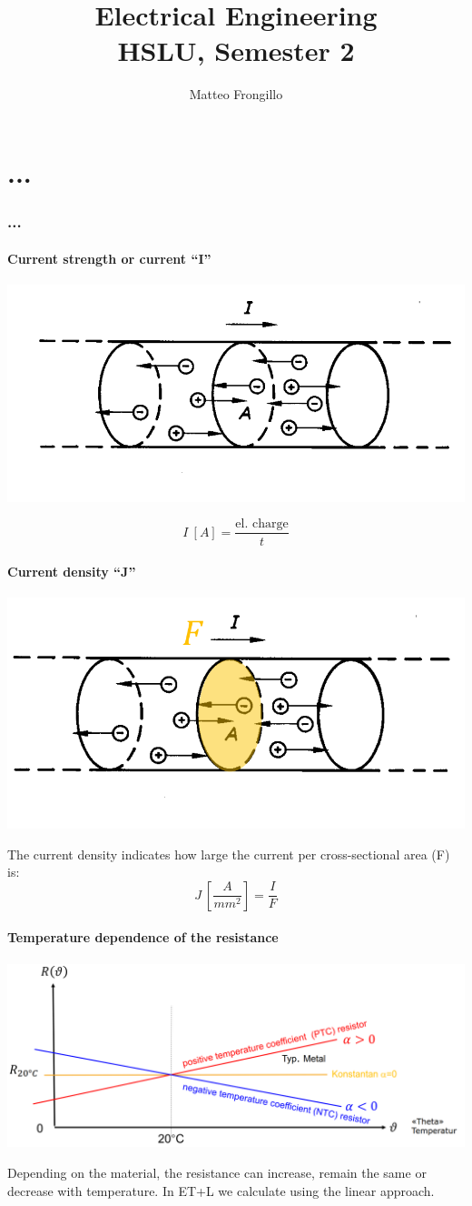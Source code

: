 \documentclass{article}
\title{\textbf{Electrical Engineering \\ HSLU, Semester 2}}
\author{Matteo Frongillo}
\date{}
\begin{document}
\maketitle
\tableofcontents
\pagebreak

\part{...}
\section{...}
\subsection{Current strength or current ``I''}
\begin{center}
    \includegraphics[width=.4\textwidth]{media/intensity.png}
\end{center}
\[I\ [A] =\dfrac{\text{el. charge}}{t}\]

\subsection{Current density ``J''}
\begin{center}
    \includegraphics[width=.4\textwidth]{media/density.png}
\end{center}
The current density indicates how large the current per cross-sectional area (F) is:
\[J\ [\dfrac{A}{mm^2}] = \dfrac{I}{F}\]

\subsection{Temperature dependence of the resistance}
\begin{center}
    \includegraphics[width=\textwidth]{media/resistance.png}
\end{center}
Depending on the material, the resistance can increase, remain the same or decrease with temperature. In
ET+L we calculate using the linear approach.
\end{document}

